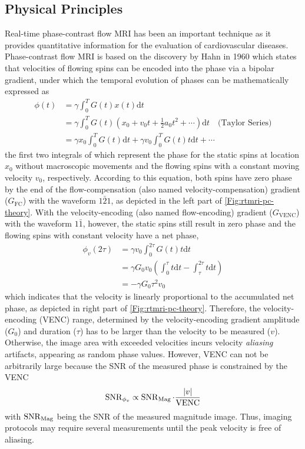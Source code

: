 \subsection{Physical Principles}
Real-time phase-contrast flow MRI has been an important technique as it provides quantitative information for the evaluation of cardiovascular diseases. Phase-contrast flow MRI is based on the discovery by Hahn in 1960 \cite{1960_PC_Hahn} which states that velocities of flowing spins can be encoded into the phase via a bipolar gradient, under which the temporal evolution of phases can be mathematically expressed as 
\begin{align} 
  \phi(t) &= \gamma \int_{0}^{T} G(t) x(t) \text{d} t \nonumber \\
          &= \gamma \int_{0}^{T} G(t) (x_0 + v_0 t + \frac{1}{2} a_0 t^2 + \cdots ) \text{d} t \quad \text{(Taylor Series)} \nonumber \\
          &= \gamma x_0 \int_{0}^{T} G(t) \text{d} t + \gamma v_0 \int_{0}^{T} G(t) t \text{d} t + \cdots \label{Equ:rtmri-pc-math}
\end{align}
the first two integrals of which represent the phase for the static spins at location $x_0$ without macroscopic movements and the flowing spins with a constant moving velocity $v_0$, respectively. According to this equation, both spins have zero phase by the end of the flow-compensation (also named velocity-compensation) gradient ($G_{\text{FC}}$) with the waveform $1 \bar{2} 1$, as depicted in the left part of \cref{Fig:rtmri-pc-theory}. With the velocity-encoding (also named flow-encoding) gradient ($G_{\text{VENC}}$) with the waveform $1 \bar{1}$, however, the static spins still result in zero phase and the flowing spins with constant velocity have a net phase, 
\begin{align} 
  \phi_v (2\tau) &= \gamma v_0 \int_{0}^{2\tau} G(t) t \text{d} t \nonumber \\
                 &= \gamma G_0 v_0 \left( \int_{0}^{\tau} t \text{d} t - \int_{\tau}^{2\tau} t \text{d} t \right) \nonumber \\
                 &= - \gamma G_0 \tau^2 v_0 \label{Equ:rtmri-pc-vel}
\end{align}
which indicates that the velocity is linearly proportional to the accumulated net phase, as depicted in right part of \cref{Fig:rtmri-pc-theory}. Therefore, the velocity-encoding (\acs{VENC}) range, determined by the velocity-encoding gradient amplitude ($G_0$) and duration ($\tau$) has to be larger than the velocity to be measured ($v$). Otherwise, the image area with exceeded velocities incurs velocity \textit{aliasing} artifacts, appearing as random phase values. However, VENC can not be arbitrarily large because the SNR of the measured phase is constrained by the VENC \cite{1991_PD_CD_PC}
\begin{equation}
  \operatorname{SNR}_{\phi_v} \propto \operatorname{SNR}_{\text{Mag}} \cdot \frac{\lvert v\rvert}{\text{VENC}}
\end{equation}
with $\operatorname{SNR}_{\text{Mag}}$ being the SNR of the measured magnitude image. Thus, imaging protocols may require several measurements until the peak velocity is free of aliasing.

